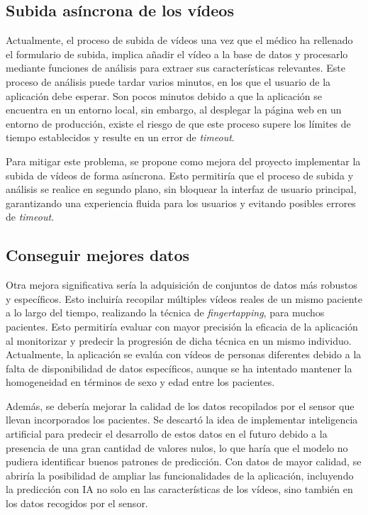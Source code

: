 \subsection{Subida asíncrona de los vídeos}
Actualmente, el proceso de subida de vídeos una vez que el médico ha rellenado el formulario de subida, implica añadir el vídeo a la base de datos y procesarlo mediante funciones de análisis para extraer sus características relevantes. Este proceso de análisis puede tardar varios minutos, en los que el usuario de la aplicación debe esperar. Son pocos minutos debido a que la aplicación se encuentra en un entorno local, sin embargo, al desplegar la página web en un entorno de producción, existe el riesgo de que este proceso supere los límites de tiempo establecidos y resulte en un error de \textit{timeout}. 

Para mitigar este problema, se propone como mejora del proyecto implementar la subida de vídeos de forma asíncrona. Esto permitiría que el proceso de subida y análisis se realice en segundo plano, sin bloquear la interfaz de usuario principal, garantizando una experiencia fluida para los usuarios y evitando posibles errores de \textit{timeout}.


\subsection{Conseguir mejores datos}
Otra mejora significativa sería la adquisición de conjuntos de datos más robustos y específicos. Esto incluiría recopilar múltiples vídeos reales de un mismo paciente a lo largo del tiempo, realizando la técnica de \textit{fingertapping}, para muchos pacientes.
Esto permitiría evaluar con mayor precisión la eficacia de la aplicación al monitorizar y predecir la progresión de dicha técnica en un mismo individuo. Actualmente, la aplicación se evalúa con vídeos de personas diferentes debido a la falta de disponibilidad de datos específicos, aunque se ha intentado mantener la homogeneidad en términos de sexo y edad entre los pacientes.

Además, se debería mejorar la calidad de los datos recopilados por el sensor que llevan incorporados los pacientes. Se descartó la idea de implementar inteligencia artificial para predecir el desarrollo de estos datos en el futuro debido a la presencia de una gran cantidad de valores nulos, lo que haría que el modelo no pudiera identificar buenos patrones de predicción. 
Con datos de mayor calidad, se abriría la posibilidad de ampliar las funcionalidades de la aplicación, incluyendo la predicción con IA no solo en las características de los vídeos, sino también en los datos recogidos por el sensor. 


